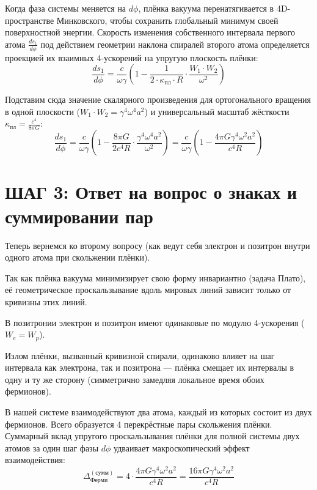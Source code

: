 \documentclass[12pt,a4paper]{article}
\begin{document}
Когда фаза системы меняется на $d\phi$, плёнка вакуума перенатягивается в 4D-пространстве Минковского, чтобы сохранить глобальный минимум своей поверхностной энергии. Скорость изменения собственного интервала первого атома $\frac{ds_1}{d\phi}$ под действием геометрии наклона спиралей второго атома определяется проекцией их взаимных 4-ускорений на упругую плоскость плёнки:
\begin{equation}
\frac{ds_1}{d\phi} = \frac{c}{\omega \gamma} \left( 1 - \frac{1}{2 \cdot \kappa_{пл} \cdot R} \cdot \frac{W_1 \cdot W_2}{\omega^2} \right)
\end{equation}

Подставим сюда значение скалярного произведения для ортогонального вращения в одной плоскости ($W_1 \cdot W_2 = \gamma^4 \omega^4 a^2$) и универсальный масштаб жёсткости $\kappa_{пл} = \frac{c^4}{8\pi G}$:
\begin{equation}
\frac{ds_1}{d\phi} = \frac{c}{\omega \gamma} \left( 1 - \frac{8\pi G}{2 c^4 R} \cdot \frac{\gamma^4 \omega^4 a^2}{\omega^2} \right) = \frac{c}{\omega \gamma} \left( 1 - \frac{4\pi G \gamma^4 \omega^2 a^2}{c^4 R} \right)
\end{equation}

\section*{ШАГ 3: Ответ на вопрос о знаках и суммировании пар}

Теперь вернемся ко второму вопросу (как ведут себя электрон и позитрон внутри одного атома при скольжении плёнки).

Так как плёнка вакуума минимизирует свою форму инвариантно (задача Плато), её геометрическое проскальзывание вдоль мировых линий зависит только от кривизны этих линий.

В позитронии электрон и позитрон имеют одинаковые по модулю 4-ускорения ($W_e = W_p$).

Излом плёнки, вызванный кривизной спирали, одинаково влияет на шаг интервала как электрона, так и позитрона — плёнка смещает их интервалы в одну и ту же сторону (симметрично замедляя локальное время обоих фермионов).

В нашей системе взаимодействуют два атома, каждый из которых состоит из двух фермионов. Всего образуется 4 перекрёстные пары скольжения плёнки. Суммарный вклад упругого проскальзывания плёнки для полной системы двух атомов за один шаг фазы $d\phi$ удваивает макроскопический эффект взаимодействия:
\begin{equation}
\Delta_{Ферми}^{(сумм)} = 4 \cdot \frac{4\pi G \gamma^4 \omega^2 a^2}{c^4 R} = \frac{16\pi G \gamma^4 \omega^2 a^2}{c^4 R}
\end{equation}
\end{document}
